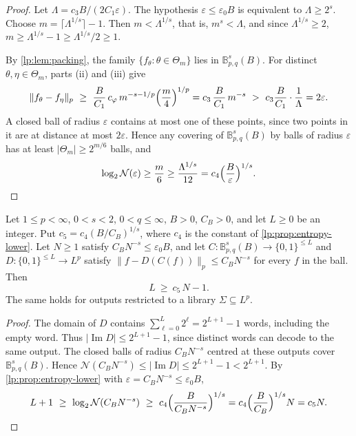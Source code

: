 \documentclass[11pt,a4paper]{article}
\begin{document}
\begin{proof}
Let $\Lambda=c_3B/(2C_1\varepsilon)$. The hypothesis $\varepsilon\le\varepsilon_0B$ is equivalent to $\Lambda\ge2^s$. Choose $m=\lceil\Lambda^{1/s}\rceil-1$. Then $m<\Lambda^{1/s}$, that is, $m^s<\Lambda$, and since $\Lambda^{1/s}\ge2$, $m\ge\Lambda^{1/s}-1\ge\Lambda^{1/s}/2\ge1$.

By \cref{lp:lem:packing}, the family $\{f_\theta:\theta\in\Theta_m\}$ lies in $\mathbb B^s_{p,q}(B)$. For distinct $\theta,\eta\in\Theta_m$, parts (ii) and (iii) give
\[
\|f_\theta-f_\eta\|_p\ \ge\ \frac B{C_1}\,c_\varphi\,m^{-s-1/p}\Bigl(\frac m4\Bigr)^{1/p}=c_3\,\frac B{C_1}\,m^{-s}\ >\ c_3\frac B{C_1}\cdot\frac1\Lambda=2\varepsilon.
\]
A closed ball of radius $\varepsilon$ contains at most one of these points, since two points in it are at distance at most $2\varepsilon$. Hence any covering of $\mathbb B^s_{p,q}(B)$ by balls of radius $\varepsilon$ has at least $|\Theta_m|\ge2^{m/6}$ balls, and
\[
\log_2\mathcal N(\varepsilon)\ge\frac m6\ge\frac{\Lambda^{1/s}}{12}=c_4\Bigl(\frac B\varepsilon\Bigr)^{1/s}.\qedhere
\]
\end{proof}

\begin{corolario}
\label{lp:cor:bits-lower}
Let $1\le p<\infty$, $0<s<2$, $0<q\le\infty$, $B>0$, $C_B>0$, and let $L\ge0$ be an integer. Put $c_5=c_4(B/C_B)^{1/s}$, where $c_4$ is the constant of \cref{lp:prop:entropy-lower}. Let $N\ge1$ satisfy $C_BN^{-s}\le\varepsilon_0B$, and let $C:\mathbb B^s_{p,q}(B)\to\{0,1\}^{\le L}$ and $D:\{0,1\}^{\le L}\to L^p$ satisfy $\|f-D(C(f))\|_p\le C_BN^{-s}$ for every $f$ in the ball. Then
\[
L\ \ge\ c_5\,N-1.
\]
The same holds for outputs restricted to a library $\Sigma\subseteq L^p$.
\end{corolario}

\begin{proof}
The domain of $D$ contains $\sum_{\ell=0}^L2^\ell=2^{L+1}-1$ words, including the empty word. Thus $|\operatorname{Im}D|\le2^{L+1}-1$, since distinct words can decode to the same output. The closed balls of radius $C_BN^{-s}$ centred at these outputs cover $\mathbb B^s_{p,q}(B)$. Hence $\mathcal N(C_BN^{-s})\le|\operatorname{Im}D|\le2^{L+1}-1<2^{L+1}$. By \cref{lp:prop:entropy-lower} with $\varepsilon=C_BN^{-s}\le\varepsilon_0B$,
\[
L+1\ \ge\ \log_2\mathcal N(C_BN^{-s})\ \ge\ c_4\Bigl(\frac{B}{C_BN^{-s}}\Bigr)^{1/s}=c_4\Bigl(\frac B{C_B}\Bigr)^{1/s}N=c_5N.\qedhere
\]
\end{proof}
\end{document}
